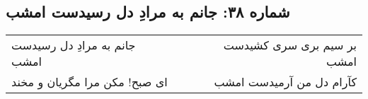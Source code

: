 \begin{center}
\section*{شماره ۳۸: جانم به مرادِ دل رسیدست امشب}
\label{sec:038}
\begin{longtable}{l p{0.5cm} r}
جانم به مرادِ دل رسیدست امشب
&&
بر سیم بری سری کشیدست امشب
\\
ای صبح! مکن مرا مگریان و مخند
&&
کآرام دل من آرمیدست امشب
\\
\end{longtable}
\end{center}
